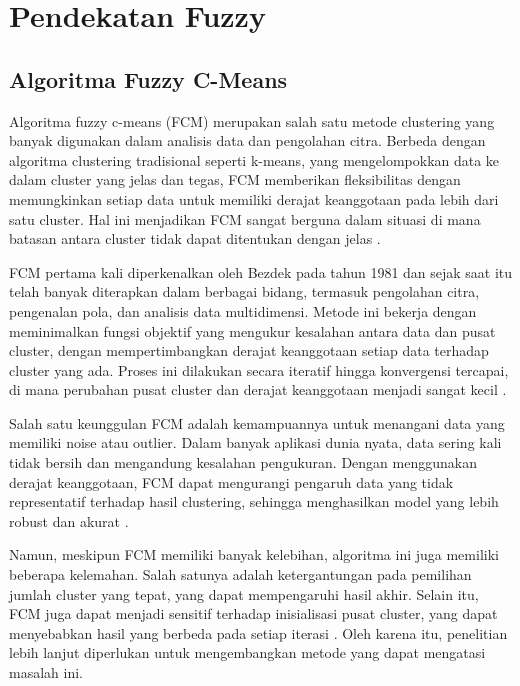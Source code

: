 \documentclass[
  oneside]{book}
\begin{document}
\part{Pendekatan Fuzzy}\label{part-pendekatan-fuzzy}

\chapter{Algoritma Fuzzy C-Means}\label{fcm}

Algoritma fuzzy c-means (FCM) merupakan salah satu metode clustering yang banyak digunakan dalam analisis data dan pengolahan citra. Berbeda dengan algoritma clustering tradisional seperti k-means, yang mengelompokkan data ke dalam cluster yang jelas dan tegas, FCM memberikan fleksibilitas dengan memungkinkan setiap data untuk memiliki derajat keanggotaan pada lebih dari satu cluster. Hal ini menjadikan FCM sangat berguna dalam situasi di mana batasan antara cluster tidak dapat ditentukan dengan jelas \citep{bezdek1981pattern}.

FCM pertama kali diperkenalkan oleh Bezdek pada tahun 1981 dan sejak saat itu telah banyak diterapkan dalam berbagai bidang, termasuk pengolahan citra, pengenalan pola, dan analisis data multidimensi. Metode ini bekerja dengan meminimalkan fungsi objektif yang mengukur kesalahan antara data dan pusat cluster, dengan mempertimbangkan derajat keanggotaan setiap data terhadap cluster yang ada. Proses ini dilakukan secara iteratif hingga konvergensi tercapai, di mana perubahan pusat cluster dan derajat keanggotaan menjadi sangat kecil \citep{dunn1973fuzzy}.

Salah satu keunggulan FCM adalah kemampuannya untuk menangani data yang memiliki noise atau outlier. Dalam banyak aplikasi dunia nyata, data sering kali tidak bersih dan mengandung kesalahan pengukuran. Dengan menggunakan derajat keanggotaan, FCM dapat mengurangi pengaruh data yang tidak representatif terhadap hasil clustering, sehingga menghasilkan model yang lebih robust dan akurat \citep{pal1995cluster}.

Namun, meskipun FCM memiliki banyak kelebihan, algoritma ini juga memiliki beberapa kelemahan. Salah satunya adalah ketergantungan pada pemilihan jumlah cluster yang tepat, yang dapat mempengaruhi hasil akhir. Selain itu, FCM juga dapat menjadi sensitif terhadap inisialisasi pusat cluster, yang dapat menyebabkan hasil yang berbeda pada setiap iterasi \citep{huang1998extensions}. Oleh karena itu, penelitian lebih lanjut diperlukan untuk mengembangkan metode yang dapat mengatasi masalah ini.
\end{document}
